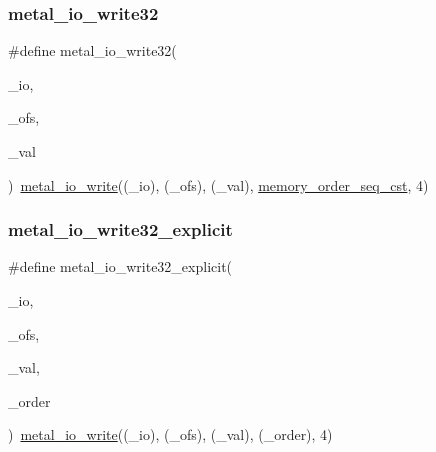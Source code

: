 \mbox{\label{group__io_ga3adf9530fe9db77471ebf0547ce616f9}} 
\subsubsection{\texorpdfstring{metal\+\_\+io\+\_\+write32}{metal\_io\_write32}}
{\footnotesize\ttfamily \#define metal\+\_\+io\+\_\+write32(\begin{DoxyParamCaption}\item[{}]{\+\_\+io,  }\item[{}]{\+\_\+ofs,  }\item[{}]{\+\_\+val }\end{DoxyParamCaption})~\hyperlink{group__io_ga74ef56cd9b16bced8c2b8553956220b4}{metal\+\_\+io\+\_\+write}((\+\_\+io), (\+\_\+ofs), (\+\_\+val), \hyperlink{compiler_2gcc_2atomic_8h_a17c2de5ae768960284c047a320f17d1ba2d21914d1edd227a890107e7878a3752}{memory\+\_\+order\+\_\+seq\+\_\+cst}, 4)}

\mbox{\label{group__io_ga9cf4ee0d917bcd208cac7e1e32034606}} 
\subsubsection{\texorpdfstring{metal\+\_\+io\+\_\+write32\+\_\+explicit}{metal\_io\_write32\_explicit}}
{\footnotesize\ttfamily \#define metal\+\_\+io\+\_\+write32\+\_\+explicit(\begin{DoxyParamCaption}\item[{}]{\+\_\+io,  }\item[{}]{\+\_\+ofs,  }\item[{}]{\+\_\+val,  }\item[{}]{\+\_\+order }\end{DoxyParamCaption})~\hyperlink{group__io_ga74ef56cd9b16bced8c2b8553956220b4}{metal\+\_\+io\+\_\+write}((\+\_\+io), (\+\_\+ofs), (\+\_\+val), (\+\_\+order), 4)}

\mbox{\label{group__io_ga1adb221edbb652ebf3ca5ea3c9635a13}} 
